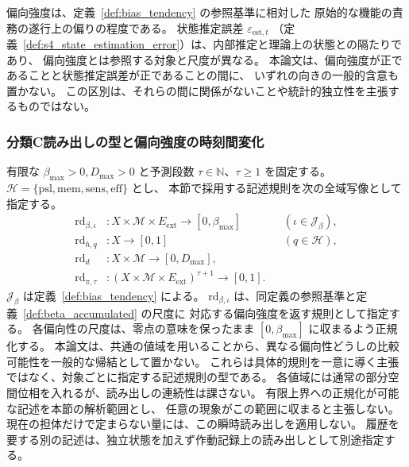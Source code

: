 \begin{remark}[偏向強度と状態推定誤差の区別]
\label{rem:beta_vs_estimation_error}
偏向強度は、定義~\ref{def:bias_tendency} の参照基準に相対した
原始的な機能の責務の遂行上の偏りの程度である。
状態推定誤差 $\varepsilon_{\mathrm{est},t}$
（定義~\ref{def:s4_state_estimation_error}）は、内部推定と理論上の状態との隔たりであり、
偏向強度とは参照する対象と尺度が異なる。
本論文は、偏向強度が正であることと状態推定誤差が正であることの間に、
いずれの向きの一般的含意も置かない。
この区別は、それらの間に関係がないことや統計的独立性を主張するものではない。
\end{remark}

\subsubsection{分類C読み出しの型と偏向強度の時刻間変化}
\begin{definition}[読み出しの型と解析範囲]
\label{def:s5_readout_types}
有限な $\beta_{\max}>0,D_{\max}>0$ と予測段数 $\tau\in\mathbb N$、$\tau\ge1$ を固定する。
$\mathcal H=\{\mathrm{psl},\mathrm{mem},\mathrm{sens},\mathrm{eff}\}$ とし、
本節で採用する記述規則を次の全域写像として指定する。
\[
\begin{aligned}
\mathrm{rd}_{\beta,\iota} &:X\times\mathcal M\times E_{\mathrm{ext}}\to[0,\beta_{\max}]
 &&(\iota\in\mathcal J_\beta),\\
\mathrm{rd}_{h,q} &:X\to[0,1]&&(q\in\mathcal H),\\
\mathrm{rd}_d &:X\times\mathcal M\to[0,D_{\max}],\\
\mathrm{rd}_{\pi,\tau} &: (X\times\mathcal M\times E_{\mathrm{ext}})^{\tau+1}\to[0,1].
\end{aligned}
\]
$\mathcal J_\beta$ は定義~\ref{def:bias_tendency} による。
$\mathrm{rd}_{\beta,\iota}$ は、同定義の参照基準と定義~\ref{def:beta_accumulated} の尺度に
対応する偏向強度を返す規則として指定する。
各偏向性の尺度は、零点の意味を保ったまま $[0,\beta_{\max}]$ に収まるよう正規化する。
本論文は、共通の値域を用いることから、異なる偏向性どうしの比較可能性を一般的な帰結として置かない。
これらは具体的規則を一意に導く主張ではなく、対象ごとに指定する記述規則の型である。
各値域には通常の部分空間位相を入れるが、読み出しの連続性は課さない。
有限上界への正規化が可能な記述を本節の解析範囲とし、
任意の現象がこの範囲に収まると主張しない。
現在の担体だけで定まらない量には、この瞬時読み出しを適用しない。
履歴を要する別の記述は、独立状態を加えず作動記録上の読み出しとして別途指定する。
\end{definition}

